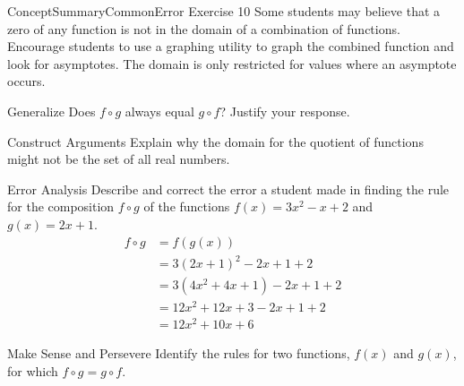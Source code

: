 \documentclass{article}
\newenvironment{practice}[2]{}{}        %
\newenvironment{te-addendum}[2]{}{}     %
\newcommand{\answer}[1]{}               %
\begin{document}
\begin{te-addendum}{ConceptSummary}{CommonError}
Exercise 10 Some students may believe that a zero of any function is not in the domain of a combination of functions. Encourage students to use a graphing utility to graph the combined function and look for asymptotes. The domain is only restricted for values where an asymptote occurs.
\end{te-addendum}

\begin{practice}{12}{2}
Generalize Does \(f\circ g\) always equal \(g\circ f\)? Justify your response.

\answer{In general \(f\circ g\) and \(g\circ f\) are usually not equal. Sample: If \(f(x)=x+1\) and \(g(x)=4x\), then \((f\circ g)(x)=4x+1\) and \((g\circ f)(x)=4x+4\).}
\end{practice}

\begin{practice}{13}{2}
Construct Arguments Explain why the domain for the quotient of functions might not be the set of all real numbers.

\answer{Because there are restrictions on the \(x\)-values in the denominator of a fraction such that it cannot be defined.}
\end{practice}

\begin{practice}{14}{2}
Error Analysis Describe and correct the error a student made in finding the rule for the composition \(f\circ g\) of the functions \(f(x)=3x^2-x+2\) and \(g(x)=2x+1\).
\[
\begin{aligned}
f\circ g&=f(g(x))\\
&=3(2x+1)^2-2x+1+2\\
&=3(4x^2+4x+1)-2x+1+2\\
&=12x^2+12x+3-2x+1+2\\
&=12x^2+10x+6
\end{aligned}
\]

\answer{When \(2x+1\) was substituted into \(3x^2-x+2\) for \(x\) and when \(-x\) was replaced with \(2x+1\), the negative sign was not distributed. Corrected: \(f(g(x))=3(2x+1)^2-(2x+1)+2=12x^2+10x+4\).}
\end{practice}

\begin{practice}{15}{2}
Make Sense and Persevere Identify the rules for two functions, \(f(x)\) and \(g(x)\), for which \(f\circ g=g\circ f\).

\answer{Answers may vary. Sample: When \(f(x)=2x\) and \(g(x)=5x\), \((f\circ g)(x)=10x\) and \((g\circ f)(x)=10x\).}
\end{practice}
\end{document}

